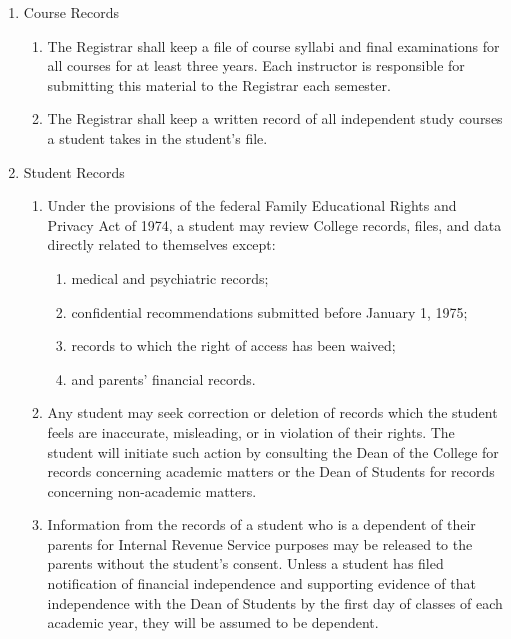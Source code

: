 \documentclass{manual}
\newcommand{\modified}[1]{}
\newcommand{\oldbreak}[1]{}
\newcommand{\itemLevelA}{\alph*.}
\newcommand{\itemLevelB}{\arabic*)}
\newcommand{\itemRefA}{\alph*}
\newcommand{\itemRefB}{\arabic*}
\begin{document}
\begin{enumerate}[label=\itemLevelA,ref=\itemRefA]
\item Course Records

\begin{enumerate}[label=\itemLevelB,ref=\itemRefB]

\item The Registrar shall keep a file of course syllabi  and final examinations for all courses for at least three years. Each instructor is responsible for submitting this material to the Registrar each semester.

\item The Registrar\modified{5/12/98}  shall keep a written record of all independent study courses a student takes in the student's file.

\end{enumerate}
\oldbreak{VII-7}

\item Student Records

\begin{enumerate}[label=\itemLevelB,ref=\itemRefB]

\item Under the provisions of the federal Family Educational Rights and Privacy Act of 1974, a student may review College records, files, and data directly related to themselves except: 

\begin{enumerate}[label=\alph*)]

\item medical and psychiatric records; 

\item confidential recommendations submitted before January 1, 1975;

\item records to which the right of access has been waived; 

\item and parents' financial records.
\end{enumerate}

\item Any student may seek correction or deletion of records which the student feels are inaccurate, misleading, or in violation of their rights. The student will initiate such action by consulting the Dean of the College for records concerning academic matters or the Dean of Students for records concerning non-academic matters.

\item Information from the records of a student who is a dependent of their parents for Internal Revenue Service purposes may be released to the parents without the student's consent. Unless a student has filed notification of financial independence and supporting evidence of that independence with the Dean of Students by the first day of classes of each academic year, they will be assumed to be dependent.


\end{enumerate}
\end{enumerate}
\end{document}
